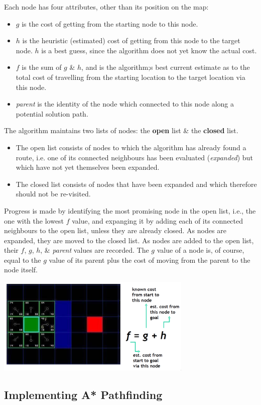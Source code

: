 \documentclass[11pt]{article}
\begin{document}
Each node has four attributes, other than its position on the map:
\begin{itemize}
    \item   $g$ is the cost of getting from the starting node to this node. 
    \item   $h$ is the heuristic (estimated) cost of getting from this node to the target node. 
            $h$ is a best guess, since the algorithm does not yet know the actual cost.
    \item   $f$ is the sum of $g$ \& $h$, and is the algorithm;s best current estimate as to the total cost of travelling from the starting location to the target location via this node.
    \item   \textit{parent} is the identity of the node which connected to this node along a potential solution path.
\end{itemize}

The algorithm maintains two lists of nodes: the \textbf{open} list \& the \textbf{closed} list. 
\begin{itemize}
    \item   The open list consists of nodes to which the algorithm has already found a route, i.e. one of its connected neighbours has been evaluated (\textit{expanded}) but which have not yet themselves been expanded.
    \item   The closed list consists of nodes that have been expanded and which therefore should not be re-visited.
\end{itemize}

Progress is made by identifying the most promising node in the open list, i.e., the one with the lowest $f$ value, and expanging it by adding each of its connected neighbours to the open list, unless they are 
already closed.
As nodes are expanded, they are moved to the closed list. 
As nodes are added to the open list, their $f$, $g$, $h$, \& \textit{parent} values are recorded.
The $g$ value of a node is, of course, equal to the $g$ value of its parent plus the cost of moving from the parent to the node itself.

\begin{center}
    \includegraphics[width=0.7\textwidth]{astar.png}
\end{center}

\subsection{Implementing A* Pathfinding}




\end{document}
